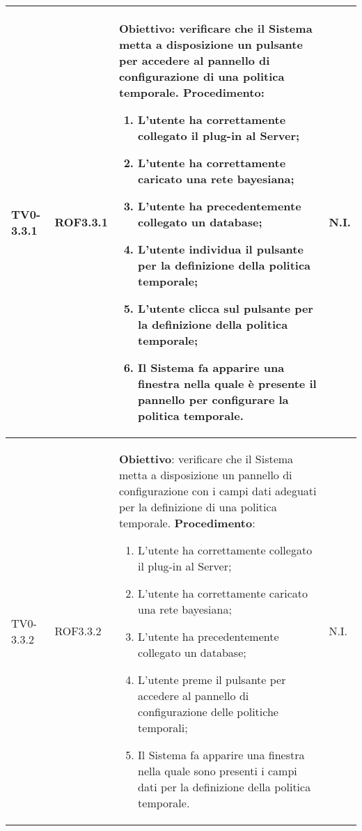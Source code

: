 \begin{longtable}{|C{.15\textwidth}|C{.13\textwidth}|m{.65\textwidth}|C{.08\textwidth}|}
TV0-3.3.1 & ROF3.3.1 &
	\textbf{Obiettivo}: verificare che il Sistema metta a disposizione un pulsante per accedere al pannello di configurazione di una politica temporale. \newline
	\textbf{Procedimento}:
	\begin{enumerate}
		\item L'utente ha correttamente collegato il plug-in al Server;
		\item L'utente ha correttamente caricato una rete bayesiana;
		\item L'utente ha precedentemente collegato un database;
		\item L'utente individua il pulsante per la definizione della politica temporale;
		\item L'utente clicca sul pulsante per la definizione della politica temporale;
		\item Il Sistema fa apparire una finestra nella quale è presente il pannello per configurare la politica temporale.
	\end{enumerate}
	& N.I. \\
\hline

TV0-3.3.2 & ROF3.3.2 &
	\textbf{Obiettivo}: verificare che il Sistema metta a disposizione un pannello di configurazione con i campi dati adeguati per la definizione di una politica temporale. \newline
	\textbf{Procedimento}:
	\begin{enumerate}
		\item L'utente ha correttamente collegato il plug-in al Server;
		\item L'utente ha correttamente caricato una rete bayesiana;
		\item L'utente ha precedentemente collegato un database;
		\item L'utente preme il pulsante per accedere al pannello di configurazione delle politiche temporali;
		\item Il Sistema fa apparire una finestra nella quale sono presenti i campi dati per la definizione della politica temporale.
	\end{enumerate}
	& N.I. \\
\hline


\end{longtable}
